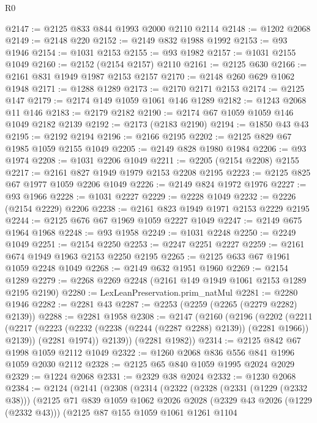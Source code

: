 \begin{lexlean}{R0}
\begin{coremodule}
@2147 := @2125 @833 @844 @1993 @2000 @2110 @2114
@2148 := @1202 @2068
@2149 := @2148 @220
@2152 := @2149 @832 @1988 @1992
@2153 := @93 @1946
@2154 := @1031 @2153
@2155 := @93 @1982
@2157 := @1031 @2155 @1049
@2160 := @2152 (@2154 @2157) @2110
@2161 := @2125 @630
@2166 := @2161 @831 @1949 @1987 @2153 @2157
@2170 := @2148 @260 @629 @1062 @1948
@2171 := @1288 @1289
@2173 := @2170 @2171 @2153
@2174 := @2125 @147
@2179 := @2174 @149 @1059 @1061 @146 @1289
@2182 := @1243 @2068 @11 @146
@2183 := @2179 @2182
@2190 := @2174 @67 @1059 @1059 @146 @1049 @2182 @2139
@2192 := @2173 (@2183 @2190)
@2194 := @1850 @43 @43
@2195 := @2192 @2194
@2196 := @2166 @2195
@2202 := @2125 @829 @67 @1985 @1059 @2155 @1049
@2205 := @2149 @828 @1980 @1984
@2206 := @93 @1974
@2208 := @1031 @2206 @1049
@2211 := @2205 (@2154 @2208) @2155
@2217 := @2161 @827 @1949 @1979 @2153 @2208 @2195
@2223 := @2125 @825 @67 @1977 @1059 @2206 @1049
@2226 := @2149 @824 @1972 @1976
@2227 := @93 @1966
@2228 := @1031 @2227
@2229 := @2228 @1049
@2232 := @2226 (@2154 @2229) @2206
@2238 := @2161 @823 @1949 @1971 @2153 @2229 @2195
@2244 := @2125 @676 @67 @1969 @1059 @2227 @1049
@2247 := @2149 @675 @1964 @1968
@2248 := @93 @1958
@2249 := @1031 @2248
@2250 := @2249 @1049
@2251 := @2154 @2250
@2253 := @2247 @2251 @2227
@2259 := @2161 @674 @1949 @1963 @2153 @2250 @2195
@2265 := @2125 @633 @67 @1961 @1059 @2248 @1049
@2268 := @2149 @632 @1951 @1960
@2269 := @2154 @1289
@2279 := @2268 @2269 @2248 (@2161 @149 @1949 @1061 @2153 @1289 @2195 @2190)
@2280 := LexLeanPreservation.prim_natMul
@2281 := @2280 @1946
@2282 := @2281 @43
@2287 := @2253 (@2259 (@2265 (@2279 @2282) @2139))
@2288 := @2281 @1958
@2308 := @2147
    (@2160
      (@2196
        (@2202
          (@2211
            (@2217 (@2223 (@2232 (@2238 (@2244 (@2287 @2288) @2139)) (@2281 @1966)) @2139))
            (@2281 @1974))
          @2139))
      (@2281 @1982))
@2314 := @2125 @842 @67 @1998 @1059 @2112 @1049
@2322 := @1260 @2068 @836 @556 @841 @1996 @1059 @2030 @2112
@2328 := @2125 @65 @840 @1059 @1995 @2024 @2029
@2329 := @1224 @2068
@2331 := @2329 @38 @2024
@2332 := @1230 @2068
@2384 := @2124
    (@2141
      (@2308
        (@2314
          (@2322
            (@2328
              (@2331 (@1229 (@2332 @38)))
              (@2125
                @71
                @839
                @1059
                @1062
                @2026
                @2028
                (@2329 @43 @2026 (@1229 (@2332 @43)))
                (@2125
                  @87
                  @155
                  @1059
                  @1061
                  @1261
                  @1104

\end{coremodule}
\end{lexlean}
